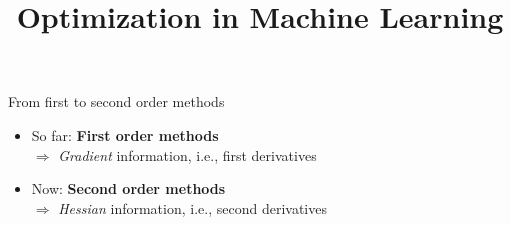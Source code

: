 \documentclass[11pt,compress,t,notes=noshow, xcolor=table]{beamer}
\title{Optimization in Machine Learning}
\date{}
\begin{document}
\sloppy

\begin{vbframe}{From first to second order methods}

\begin{itemize}
    \setlength{\itemsep}{1em}
    \item So far: \textbf{First order methods} \\
        $\Rightarrow$ \textit{Gradient} information, i.e., first derivatives 
    \item Now: \textbf{Second order methods} \\
        $\Rightarrow$ \textit{Hessian} information, i.e., second derivatives
\end{itemize}

\end{vbframe}
\end{document}
